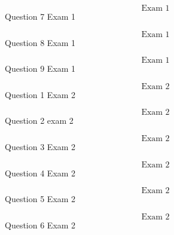 \documentclass{article}
\begin{document}
    $$\text{Exam 1}$$
    Question 7 Exam 1
    \pagebreak

    $$\text{Exam 1}$$
    Question 8 Exam 1
    \pagebreak

    $$\text{Exam 1}$$
    Question 9 Exam 1
    \pagebreak

    $$\text{Exam 2}$$
    Question 1 Exam 2
    \pagebreak

    $$\text{Exam 2}$$
    Question 2 exam 2
    \pagebreak

    $$\text{Exam 2}$$
    Question 3 Exam 2
    \pagebreak


    $$\text{Exam 2}$$
    Question 4 Exam 2
    \pagebreak


    $$\text{Exam 2}$$
    Question 5 Exam 2
    \pagebreak

    $$\text{Exam 2}$$
    Question 6 Exam 2
    \pagebreak
\end{document}
